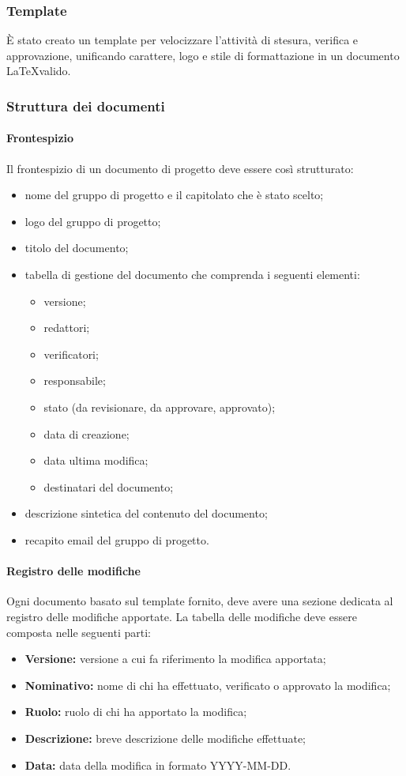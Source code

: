   \subsubsection{Template}
  \`E stato creato un template per velocizzare l'attività di stesura, verifica e
  approvazione, unificando carattere, logo e stile di formattazione
  in un documento \LaTeX \space valido.

  \subsubsection{Struttura dei documenti}
  \paragraph{Frontespizio}
  Il frontespizio di un documento di progetto deve essere così strutturato:
  \begin{itemize}
    \item nome del gruppo di progetto e il capitolato che è stato scelto;
    \item logo del gruppo di progetto;
    \item titolo del documento;
    \item tabella di gestione del documento che comprenda i seguenti elementi:
    \begin{itemize}
      \item versione;
      \item redattori;
      \item verificatori;
      \item responsabile;
      \item stato (da revisionare, da approvare, approvato);
      \item data di creazione;
      \item data ultima modifica;
      \item destinatari del documento;
    \end{itemize}
    \item descrizione sintetica del contenuto del documento;
    \item recapito email del gruppo di progetto.
  \end{itemize}
  \paragraph{Registro delle modifiche}
  Ogni documento basato sul template fornito, deve avere una sezione dedicata al registro delle modifiche apportate.
  La tabella delle modifiche deve essere composta nelle seguenti parti:
  \begin{itemize}
    \item \textbf{Versione:} versione a cui fa riferimento la modifica apportata;
    \item \textbf{Nominativo:} nome di chi ha effettuato, verificato o approvato la modifica;
    \item \textbf{Ruolo:} ruolo di chi ha apportato la modifica;
    \item \textbf{Descrizione:} breve descrizione delle modifiche effettuate;
    \item \textbf{Data:} data della modifica in formato YYYY-MM-DD.
  \end{itemize}
